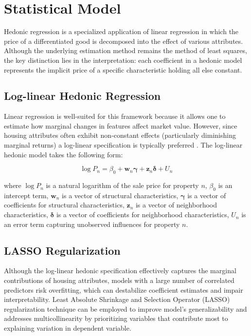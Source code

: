 \section*{Statistical Model }
Hedonic regression is a specialized application of linear regression in which the price of a differentiated good is decomposed into the effect of various attributes. Although the underlying estimation method remains the method of least squares, the key distinction lies in the interpretation: each coefficient in a hedonic model represents the implicit price of a specific characteristic holding all else constant. 

\subsection*{Log-linear Hedonic Regression}
Linear regression is well-suited for this framework because it allows one to estimate how marginal changes in features affect market value. However, since housing attributes often exhibit non-constant effects (particularly diminishing marginal returns) a log-linear specification is typically preferred \citep{abelson:1979}. The log-linear hedonic model takes the following form: 

\[
\log P_n = \beta_0 + \mathbf{w}_n \boldsymbol\gamma + \mathbf{z}_n \boldsymbol\delta + U_n
\]

\noindent where  \( \log P_n \) is a natural logarithm of the sale price for property \(n\), \( \beta_0 \) is an intercept term, \( \mathbf{w}_n \) is a vector of structural characteristics, \( \boldsymbol\gamma \) is a vector of coefficients for structural characteristics, \( \mathbf{z}_n \) is a vector of neighborhood characteristics, \( \boldsymbol\delta \) is a vector of coefficients for neighborhood characteristics, \( U_n \) is an error term capturing unobserved influences for property \(n\).


\subsection*{LASSO Regularization}

Although the log-linear hedonic specification effectively captures the marginal contributions of housing attributes, models with a large number of correlated predictors risk overfitting, which can destabilize coefficient estimates and impair interpretability. Least Absolute Shrinkage and Selection Operator (LASSO) regularization technique can be employed to improve model's generalizability and addresses multicollinearity by prioritizing variables that contribute most to explaining variation in dependent variable.

